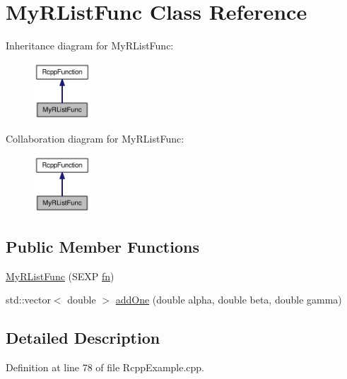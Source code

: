 \hypertarget{classMyRListFunc}{
\section{MyRListFunc Class Reference}
\label{classMyRListFunc}
}
Inheritance diagram for MyRListFunc:\nopagebreak
\begin{figure}[H]
\begin{center}
\leavevmode
\includegraphics[width=60pt]{classMyRListFunc__inherit__graph}
\end{center}
\end{figure}
Collaboration diagram for MyRListFunc:\nopagebreak
\begin{figure}[H]
\begin{center}
\leavevmode
\includegraphics[width=60pt]{classMyRListFunc__coll__graph}
\end{center}
\end{figure}
\subsection*{Public Member Functions}
\begin{CompactItemize}
\item 
\hyperlink{classMyRListFunc_7ab78b186d110497a404f88009455af6}{MyRListFunc} (SEXP \hyperlink{classRcppFunction_a6b5966224b8b7d158be6cdfc3612063}{fn})
\item 
std::vector$<$ double $>$ \hyperlink{classMyRListFunc_0dec3b59e1e235c0502594a5d92cae13}{addOne} (double alpha, double beta, double gamma)
\end{CompactItemize}


\subsection{Detailed Description}


Definition at line 78 of file RcppExample.cpp.

